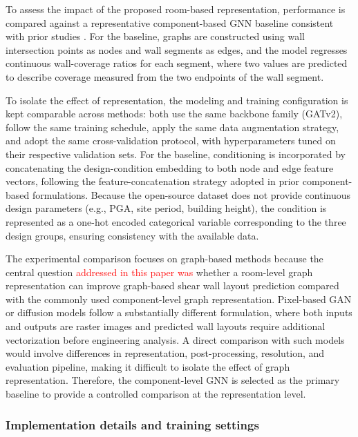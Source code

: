 To assess the impact of the proposed room-based representation, performance is compared against a representative component-based GNN baseline consistent with prior studies \cite{zhaoIntelligentDesignShear2023b,zhaoDesignconditioninformedShearWall2023d}. For the baseline, graphs are constructed using wall intersection points as nodes and wall segments as edges, and the model regresses continuous wall-coverage ratios for each segment, where two values are predicted to describe coverage measured from the two endpoints of the wall segment.

To isolate the effect of representation, the modeling and training configuration is kept comparable across methods: both use the same backbone family (GATv2), follow the same training schedule, apply the same data augmentation strategy, and adopt the same cross-validation protocol, with hyperparameters tuned on their respective validation sets. For the baseline, conditioning is incorporated by concatenating the design-condition embedding to both node and edge feature vectors, following the feature-concatenation strategy adopted in prior component-based formulations. Because the open-source dataset does not provide continuous design parameters (e.g., PGA, site period, building height), the condition is represented as a one-hot encoded categorical variable corresponding to the three design groups, ensuring consistency with the available data.

The experimental comparison focuses on graph-based methods because the central question \textcolor{red}{addressed in this paper was} whether a room-level graph representation can improve graph-based shear wall layout prediction compared with the commonly used component-level graph representation. Pixel-based GAN or diffusion models follow a substantially different formulation, where both inputs and outputs are raster images and predicted wall layouts require additional vectorization before engineering analysis. A direct comparison with such models would involve differences in representation, post-processing, resolution, and evaluation pipeline, making it difficult to isolate the effect of graph representation. Therefore, the component-level GNN is selected as the primary baseline to provide a controlled comparison at the representation level.


\subsubsection{Implementation details and training settings}
\label{subsubsec:implementation}

